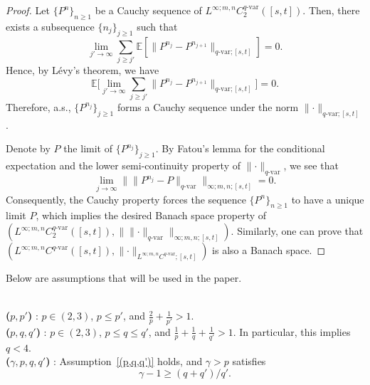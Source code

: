 \documentclass[11pt,reqno]{amsart}
\makeatletter
\newcommand{\cond}[2]{%
    \phantomsection
    \def\@currentlabel{(#1)}%
    \label{#2}%
    \textup{\bf(#1)}
} %
\newenvironment{assumptionp}[1]{
\renewcommand\theassumptionalt{#1}
\assumptionalt
}{\endassumptionalt}
\numberwithin{equation}{section}
\def\E{\mathbb E}
\makeatother
\begin{document}
\begin{proof}
Let $\{P^n\}_{n \ge 1}$ be a Cauchy sequence of $L^{\infty;m,n}C^{q\text{-}\mathrm{var}}_2([s,t])$. Then, there exists a subsequence $\{n_j\}_{j \ge 1}$ such that 
\begin{equation*}
\lim_{j' \to \infty}\sum_{j \ge j'} \E \left[ \|P^{n_j} - P^{n_{j+1}}\|_{q\text{-}\mathrm{var};[s,t]} \right] = 0.
\end{equation*}
Hence, by L\'evy's theorem, we have 
\begin{equation*}
\E \Big[\lim_{j' \to \infty}\sum_{j \ge j'}  \|P^{n_j} - P^{n_{j+1}}\|_{q\text{-}\mathrm{var};[s,t]} \Big] = 0.
\end{equation*}
Therefore, a.s., $\{P^{n_j}\}_{j \ge 1}$ forms a Cauchy sequence under the norm $\|\bm\cdot\|_{q\text{-}\mathrm{var};[s,t]}$. 

Denote by $P$ the limit of $\{P^{n_j}\}_{j \ge 1}$. By Fatou's lemma for the conditional expectation and the lower semi-continuity property of $\|\bm\cdot\|_{q\text{-}\mathrm{var}}$, we see that  
\begin{equation*}
\lim_{j\to \infty } \big\| \|P^{n_j} - P\|_{q\text{-}\mathrm{var}} \big\|_{\infty;m,n;[s,t]} = 0.
\end{equation*}
Consequently, the Cauchy property forces the sequence $\{P^n\}_{n\ge 1}$ to have a unique limit $P$, which implies the desired Banach space property of $(L^{\infty;m,n}C^{q\text{-}\mathrm{var}}_2([s,t]), \| \|\bm\cdot\|_{q\text{-}\mathrm{var}} \|_{\infty;m,n;[s,t]})$. Similarly, one can prove that $(L^{\infty;m,n}C^{q\text{-}\mathrm{var}}([s,t]), \|\bm\cdot\|_{L^{\infty;m,n}C^{q\text{-}\mathrm{var}};[s,t]})$ is also a Banach space. 
\end{proof}



Below are assumptions that will be used in the paper.  
\begin{assumptionp}{($\mathbf{A}_{\mathbf{par}}$)}
\noindent  \\[0.5em]
\cond{$p,p'$}{(p,p')}:
$p \in(2,3)$, $p \le p'$, and $\frac{2}{p} + \frac{1}{p'} > 1$. \\[0.5em] 
\noindent \cond{$p,q,q'$}{(p,q,q')}:
$p \in(2,3)$, $p \le q \le q'$, and $\frac{1}{p} + \frac{1}{q} + \frac{1}{q'} > 1$. In particular, this implies $q < 4$.
\\[0.5em] 
\noindent \cond{$\gamma,p,q,q'$}{(gamma)}:
Assumption~\ref{(p,q,q')} holds, and $\gamma > p$ satisfies 
\begin{equation*}
\gamma - 1 \ge (q+q')/q'.
\end{equation*}
\end{assumptionp}
\end{document}
